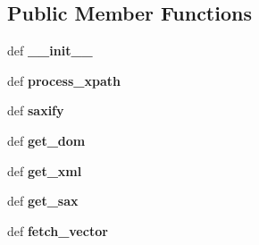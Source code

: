 \subsection*{Public Member Functions}
\begin{DoxyCompactItemize}
\item 
\hypertarget{classcheshire3_1_1record_1_1_sax_record_ace62965dfe44aa8316e7a8c3b4150465}{def {\bfseries \-\_\-\-\_\-init\-\_\-\-\_\-}}\label{classcheshire3_1_1record_1_1_sax_record_ace62965dfe44aa8316e7a8c3b4150465}

\item 
\hypertarget{classcheshire3_1_1record_1_1_sax_record_a85238145fc0e94bf8fa71801fe68507b}{def {\bfseries process\-\_\-xpath}}\label{classcheshire3_1_1record_1_1_sax_record_a85238145fc0e94bf8fa71801fe68507b}

\item 
\hypertarget{classcheshire3_1_1record_1_1_sax_record_a60d6d2290e8e348014d7dc990cba3ef1}{def {\bfseries saxify}}\label{classcheshire3_1_1record_1_1_sax_record_a60d6d2290e8e348014d7dc990cba3ef1}

\item 
\hypertarget{classcheshire3_1_1record_1_1_sax_record_a0c6615d975eeff2fcdccb4ee80499507}{def {\bfseries get\-\_\-dom}}\label{classcheshire3_1_1record_1_1_sax_record_a0c6615d975eeff2fcdccb4ee80499507}

\item 
\hypertarget{classcheshire3_1_1record_1_1_sax_record_a47297ea5dfbd46a5d0bb6c92a12b35cd}{def {\bfseries get\-\_\-xml}}\label{classcheshire3_1_1record_1_1_sax_record_a47297ea5dfbd46a5d0bb6c92a12b35cd}

\item 
\hypertarget{classcheshire3_1_1record_1_1_sax_record_ace7e6c8272225e9d7b780d09664a0b3d}{def {\bfseries get\-\_\-sax}}\label{classcheshire3_1_1record_1_1_sax_record_ace7e6c8272225e9d7b780d09664a0b3d}

\item 
\hypertarget{classcheshire3_1_1record_1_1_sax_record_a1b56388542ab00c60570edf0b258fd98}{def {\bfseries fetch\-\_\-vector}}\label{classcheshire3_1_1record_1_1_sax_record_a1b56388542ab00c60570edf0b258fd98}

\end{DoxyCompactItemize}
